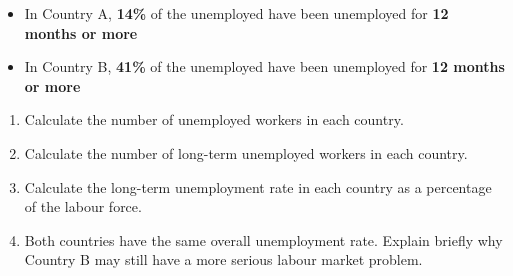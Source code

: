 \documentclass[12pt]{article}
\begin{document}
\begin{enumerate}
\begin{itemize}
    \item In Country A, \textbf{14\%} of the unemployed have been unemployed for \textbf{12 months or more}
    \item In Country B, \textbf{41\%} of the unemployed have been unemployed for \textbf{12 months or more}
\end{itemize}



\begin{enumerate}[label=(\alph*)]
    \item Calculate the number of unemployed workers in each country. \hfill 

    \item Calculate the number of long-term unemployed workers in each country. \hfill 

    \item Calculate the long-term unemployment rate in each country as a percentage of the labour force. \hfill 

    \item Both countries have the same overall unemployment rate. Explain briefly why Country B may still have a more serious labour market problem. \hfill 
\end{enumerate}
\end{enumerate}
\end{document}
